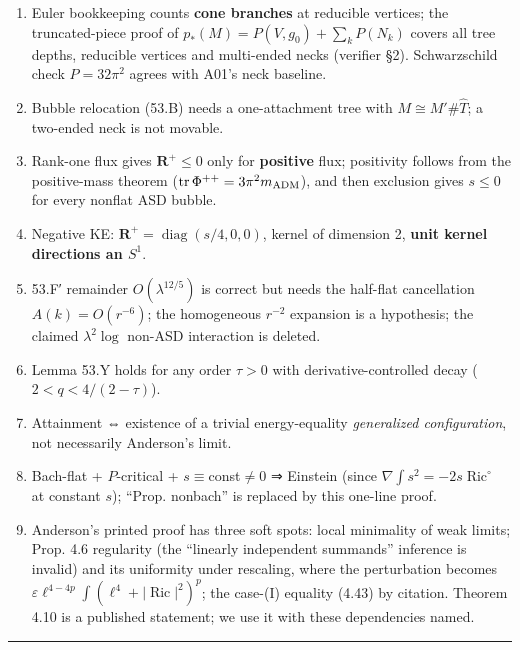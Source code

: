 \documentclass[
  10pt,
]{report}
\providecommand{\tightlist}{%
  \setlength{\itemsep}{0pt}\setlength{\parskip}{0pt}}
\begin{document}
\begin{enumerate}
\def\labelenumi{\arabic{enumi}.}
\tightlist
\item
  Euler bookkeeping counts \textbf{cone branches} at reducible vertices;
  the truncated-piece proof of \(p_*(M)=P(V,g_0)+\sum_kP(N_k)\) covers
  all tree depths, reducible vertices and multi-ended necks (verifier
  §2). Schwarzschild check \(P=32\pi^2\) agrees with A01's neck
  baseline.
\item
  Bubble relocation (53.B) needs a one-attachment tree with
  \(M\cong M'\#\widehat T\); a two-ended neck is not movable.
\item
  Rank-one flux gives \(\mathbf R^+\le0\) only for \textbf{positive}
  flux; positivity follows from the positive-mass theorem
  (\(\operatorname{tr}\Phi^{++}=3\pi^2m_{\rm ADM}\)), and then exclusion
  gives \(s\le0\) for every nonflat ASD bubble.
\item
  Negative KE: \(\mathbf R^+=\operatorname{diag}(s/4,0,0)\), kernel of
  dimension 2, \textbf{unit kernel directions an \(S^1\)}.
\item
  53.F′ remainder \(O(\lambda^{12/5})\) is correct but needs the
  half-flat cancellation \(A(k)=O(r^{-6})\); the homogeneous \(r^{-2}\)
  expansion is a hypothesis; the claimed \(\lambda^2\log\) non-ASD
  interaction is deleted.
\item
  Lemma 53.Y holds for any order \(\tau>0\) with derivative-controlled
  decay (\(2<q<4/(2-\tau)\)).
\item
  Attainment ⇔ existence of a trivial energy-equality \emph{generalized
  configuration}, not necessarily Anderson's limit.
\item
  Bach-flat + \(P\)-critical + \(s\equiv\)const\(\neq0\) ⇒ Einstein
  (since \(\nabla\!\int s^2=-2s\operatorname{Ric}^\circ\) at constant
  \(s\)); ``Prop. nonbach'' is replaced by this one-line proof.
\item
  Anderson's printed proof has three soft spots: local minimality of
  weak limits; Prop. 4.6 regularity (the ``linearly independent
  summands'' inference is invalid) and its uniformity under rescaling,
  where the perturbation becomes
  \(\varepsilon\ell^{4-4p}\int(\ell^4+|\operatorname{Ric}|^2)^p\); the
  case-(I) equality (4.43) by citation. Theorem 4.10 is a published
  statement; we use it with these dependencies named.
\end{enumerate}

\begin{center}\rule{0.5\linewidth}{0.5pt}\end{center}
\end{document}
